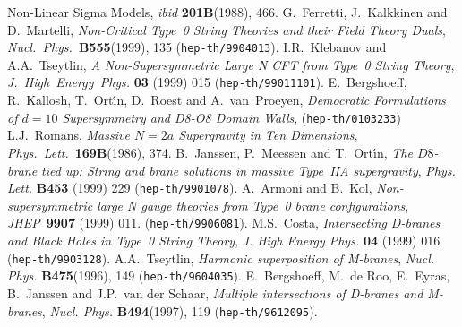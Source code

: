 \documentclass[12pt,a4paper]{article}
\begin{document}
\begin{thebibliography}{99}
{                Non-Linear Sigma Models},
                {\it ibid} {\bf 201B}(1988), 466.
%
 G.~Ferretti, J.~Kalkkinen and D.~Martelli,
                 {\sl Non-Critical Type~0 String Theories and 
                 their Field Theory Duals},
                 {\it Nucl.~Phys.}~{\bf B555}(1999), 135
                ({\tt hep-th/9904013}).
%
 I.R.~Klebanov and A.A.~Tseytlin,
        {\sl A Non-Supersymmetric Large N CFT from 
             Type~0 String Theory},
        {\it J.~High~Energy~Phys.} {\bf 03} (1999) 015
        ({\tt hep-th/99011101}).
%
 E.~Bergshoeff, R.~Kallosh, T.~Ort\'{\i}n,
                               D.~Roest and A.~van~Proeyen,
     {\sl Democratic Formulations of $d=10$ Supersymmetry and 
          D8-O8 Domain Walls},
      ({\tt hep-th/0103233})              
%
 L.J.~Romans,
          {\sl Massive $N=2a$ Supergravity in Ten Dimensions},
                 {\it Phys.~Lett.}~{\bf 169B}(1986), 374.
%
 B.~Janssen, P.~Meessen and T.~Ort\'{\i}n,
        {\sl The $D8$-brane tied up: String and brane
              solutions in massive Type~IIA supergravity},
        {\it Phys. Lett.} {\bf B453} (1999) 229
        ({\tt hep-th/9901078}). 
%
 A.~Armoni and B.~Kol,
                        {\sl Non-supersymmetric large N gauge theories from 
                        Type~0 brane  configurations},
                        {\it JHEP}~{\bf 9907} (1999) 011.
                        ({\tt hep-th/9906081}).
%
 M.S.~Costa,
        {\sl Intersecting D-branes and Black Holes in 
             Type~0 String Theory},
        {\it J. High Energy Phys.} {\bf 04} (1999) 016
        ({\tt hep-th/9903128}).
%
 A.A.~Tseytlin,
        {\sl Harmonic superposition of M-branes},
        {\it Nucl. Phys.} {\bf B475}(1996), 149
        ({\tt hep-th/9604035}).
%
 E.~Bergshoeff, M.~de Roo, E.~Eyras, B.~Janssen and 
                     J.P.~van der Schaar,
        {\sl Multiple intersections of D-branes and M-branes},
        {\it Nucl. Phys.} {\bf B494}(1997), 119
        ({\tt hep-th/9612095}).


\end{thebibliography}
\end{document}
